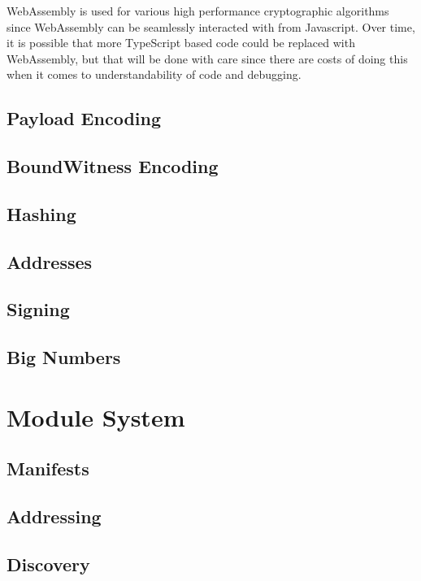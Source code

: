 \documentclass{article}
\begin{document}
WebAssembly is used for various high performance cryptographic algorithms since WebAssembly can be seamlessly interacted with from Javascript.  Over time, it is possible that more TypeScript based code could be replaced with WebAssembly, but that will be done with care since there are costs of doing this when it comes to understandability of code and debugging.

\subsection{Payload Encoding}

\subsection{BoundWitness Encoding}

\subsection{Hashing}

\subsection{Addresses}

\subsection{Signing}

\subsection{Big Numbers}

\section{Module System}

\subsection{Manifests}

\subsection{Addressing}

\subsection{Discovery}
\end{document}
